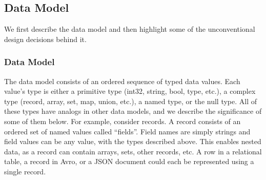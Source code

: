 \vspace{-1em}
\subsection{\sys{} Data Model} \label{ss:zed_data_model}

\begin{comment}
The \sys{} data model is guided by two key principles. First:

{\bf P1:} {\em Every data value should have an explicit, queryable data type.}

\noindent{}{\em Explicit} types are an essential property of the relational model. They enable efficient storage formats~\cite{parquet, orc, protobufs, avro, dremel} and faster parsing and querying than with JSON data, which is known to be difficult to parse efficiently~\cite{mison, sparser}. Types that are also {\em queryable} enable rich data introspection, queries by type, and shaping by type (\S\ref{ss:hybrid_schema}). At the same time:

{\bf P2:} {\em We should be flexible about which data types are allowed to coexist in the same file, table, or query results.}

\noindent{}This {\em flexibility} is essential to the document model and allows any data value with valid syntax to be appended to a file, regardless of what other data or data types are already present in that file. This makes it easy to accommodate heterogeneous and evolving data without predefining its schema.
\end{comment}

We first describe the \sys{} data model and then highlight some of the unconventional design decisions behind it.

\subsubsection{Data Model}

The \sys{} data model consists of an ordered sequence of typed data values. Each value's type is either a primitive type (int32, string, bool, type, etc.), a complex type (record, array, set, map, union, etc.), a named type, or the null type. All of these types have analogs in other data models, and we describe the significance of some of them below. For example, consider \sys{} records. A record consists of an ordered set of named values called ``fields''. Field names are simply strings and field values can be any \sys{} value, with the types described above. This enables nested data, as a record can contain arrays, sets, other records, etc. A row in a relational table, a record in Avro, or a JSON document could each be represented using a single \sys{} record.

